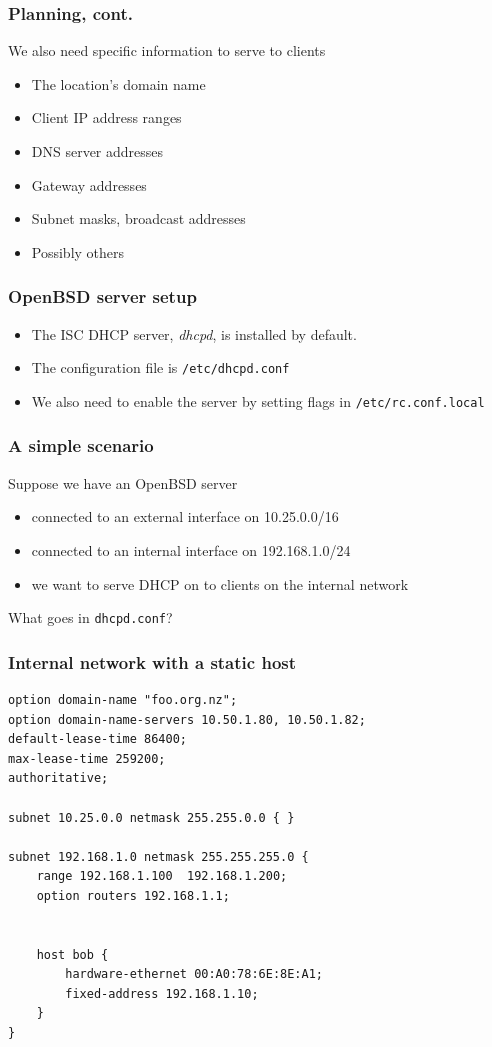\documentclass[10pt]{beamer}
\begin{document}
\begin{frame}
	\frametitle{Planning, cont.}
	
	We also need specific information to serve to clients
	\begin{itemize}
		\item The location's domain name
		\item Client IP address ranges
		\item DNS server addresses
		\item Gateway addresses
		\item Subnet masks, broadcast addresses
		\item Possibly others
	\end{itemize}  
\end{frame}


\begin{frame}
	\frametitle{OpenBSD server setup}
	\begin{itemize}
		\item The ISC DHCP server, \emph{dhcpd}, is installed by default.
		\item The configuration file is \texttt{/etc/dhcpd.conf}
		\item We also need to enable the server by setting flags in \texttt{/etc/rc.conf.local}
	\end{itemize}  
\end{frame}

\begin{frame}
	\frametitle{A simple scenario}
	Suppose we have an OpenBSD server 
	\begin{itemize}
		\item connected to an external interface on 10.25.0.0/16
		\item connected to an internal interface on 192.168.1.0/24
		\item we want to serve DHCP on to clients on the internal network
	\end{itemize}  
	
	What goes in \texttt{dhcpd.conf}?
\end{frame}

\begin{frame}[fragile]
	\frametitle{Internal network with a static host}
	\begin{verbatim}
option domain-name "foo.org.nz";
option domain-name-servers 10.50.1.80, 10.50.1.82;
default-lease-time 86400;
max-lease-time 259200;
authoritative;

subnet 10.25.0.0 netmask 255.255.0.0 { }

subnet 192.168.1.0 netmask 255.255.255.0 {
    range 192.168.1.100  192.168.1.200;
    option routers 192.168.1.1;
    

    host bob {
        hardware-ethernet 00:A0:78:6E:8E:A1;
        fixed-address 192.168.1.10;
    }
}
	
	\end{verbatim}
\end{frame}
\end{document}

